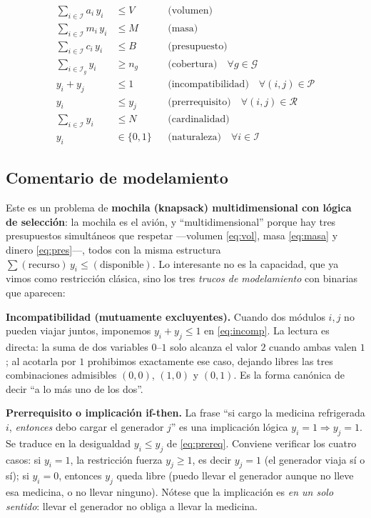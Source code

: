 \documentclass[11pt]{article}
\begin{document}
\begin{align}
\sum_{i \in \mathcal{I}} a_i \, y_i &\le V
    & &\text{(volumen)} \label{eq:vol}\\[4pt]
\sum_{i \in \mathcal{I}} m_i \, y_i &\le M
    & &\text{(masa)} \label{eq:masa}\\[4pt]
\sum_{i \in \mathcal{I}} c_i \, y_i &\le B
    & &\text{(presupuesto)} \label{eq:pres}\\[4pt]
\sum_{i \in \mathcal{I}_g} y_i &\ge n_g
    & &\text{(cobertura)} \quad \forall g \in \mathcal{G} \label{eq:cob}\\[4pt]
y_i + y_j &\le 1
    & &\text{(incompatibilidad)} \quad \forall (i,j) \in \mathcal{P} \label{eq:incomp}\\[4pt]
y_i &\le y_j
    & &\text{(prerrequisito)} \quad \forall (i,j) \in \mathcal{R} \label{eq:prereq}\\[4pt]
\sum_{i \in \mathcal{I}} y_i &\le N
    & &\text{(cardinalidad)} \label{eq:card}\\[4pt]
y_i &\in \{0,1\}
    & &\text{(naturaleza)} \quad \forall i \in \mathcal{I} \label{eq:bin}
\end{align}

\subsection*{Comentario de modelamiento}

Este es un problema de \textbf{mochila (knapsack) multidimensional con lógica de selección}: la mochila es el avión, y ``multidimensional'' porque hay tres presupuestos simultáneos que respetar —volumen \eqref{eq:vol}, masa \eqref{eq:masa} y dinero \eqref{eq:pres}—, todos con la misma estructura $\sum(\text{recurso})\,y_i \le (\text{disponible})$. Lo interesante no es la capacidad, que ya vimos como restricción clásica, sino los tres \emph{trucos de modelamiento} con binarias que aparecen:

\medskip
\noindent\textbf{Incompatibilidad (mutuamente excluyentes).} Cuando dos módulos $i,j$ no pueden viajar juntos, imponemos $y_i + y_j \le 1$ en \eqref{eq:incomp}. La lectura es directa: la suma de dos variables $0$--$1$ solo alcanza el valor $2$ cuando ambas valen $1$; al acotarla por $1$ prohibimos exactamente ese caso, dejando libres las tres combinaciones admisibles $(0,0)$, $(1,0)$ y $(0,1)$. Es la forma canónica de decir ``a lo más uno de los dos''.

\medskip
\noindent\textbf{Prerrequisito o implicación if-then.} La frase ``si cargo la medicina refrigerada $i$, \emph{entonces} debo cargar el generador $j$'' es una implicación lógica $y_i = 1 \Rightarrow y_j = 1$. Se traduce en la desigualdad $y_i \le y_j$ de \eqref{eq:prereq}. Conviene verificar los cuatro casos: si $y_i=1$, la restricción fuerza $y_j \ge 1$, es decir $y_j=1$ (el generador viaja sí o sí); si $y_i=0$, entonces $y_j$ queda libre (puedo llevar el generador aunque no lleve esa medicina, o no llevar ninguno). Nótese que la implicación es \emph{en un solo sentido}: llevar el generador no obliga a llevar la medicina.
\end{document}
